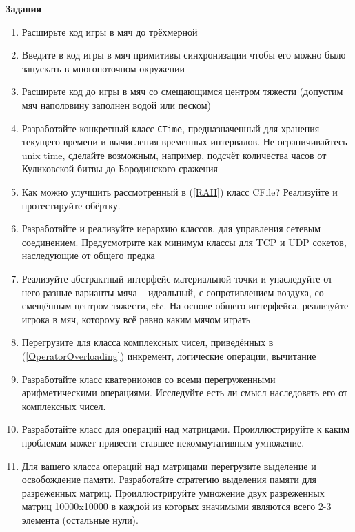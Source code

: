 \documentclass[a4paper,12pt,oneside]{book}
\begin{document}
\textbf{Задания}

\begin{enumerate}
\item
Расширьте код игры в мяч до трёхмерной 

\item
Введите в код игры в мяч примитивы синхронизации чтобы его можно было запускать в многопоточном окружении

\item
Расширьте код до игры в мяч со смещающимся центром тяжести (допустим мяч наполовину заполнен водой или песком)

\item
Разработайте конкретный класс \lstinline!CTime!, предназначенный для хранения текущего времени и вычисления временных интервалов. Не ограничивайтесь unix time, сделайте возможным, например, подсчёт количества часов от Куликовской битвы до Бородинского сражения

\item
Как можно улучшить рассмотренный в (\ref{RAII}) класс CFile? Реализуйте и протестируйте обёртку.

\item
Разработайте и реализуйте иерархию классов, для управления сетевым соединением. Предусмотрите как минимум классы для TCP и UDP сокетов, наследующие от общего предка

\item
Реализуйте абстрактный интерфейс материальной точки и унаследуйте от него разные варианты мяча -- идеальный, с сопротивлением воздуха, со смещённым центром тяжести, etc. На основе общего интерфейса, реализуйте игрока в мяч, которому всё равно каким мячом играть

\item
Перегрузите для класса комплексных чисел, приведённых в (\ref{OperatorOverloading}) инкремент, логические операции, вычитание

\item
Разработайте класс кватернионов со всеми перегруженными арифметическими операциями. Исследуйте есть ли смысл наследовать его от комплексных чисел.

\item
Разработайте класс для операций над матрицами. Проиллюстрируйте к каким проблемам может привести ставшее некоммутативным умножение.

\item
Для вашего класса операций над матрицами перегрузите выделение и освобождение памяти. Разработайте стратегию выделения памяти для разреженных матриц. Проиллюстрируйте умножение двух разреженных матриц 10000x10000 в каждой из которых значимыми являются всего 2-3 элемента (остальные нули).

\end{enumerate}
\end{document}
